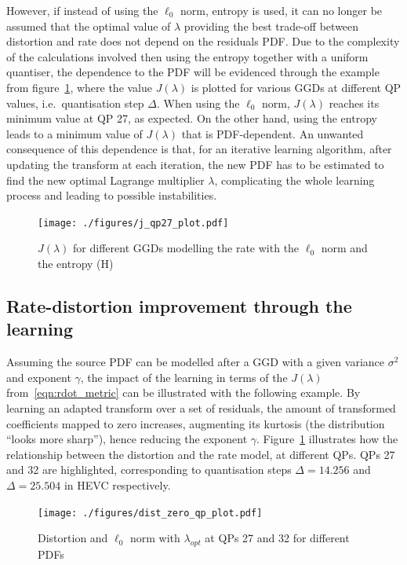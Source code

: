 \documentclass[11pt,a4paper,openright,twoside]{book}
\numberwithin{equation}{section} %
\begin{document}
However, if instead of using the $\ell_0$ norm, entropy is used, it can
no longer be assumed that the optimal value of $\lambda$ providing the
best trade-off between distortion and rate does not depend on the
residuals \ac{PDF}.
Due to the complexity of the calculations involved then using the
entropy together with a uniform quantiser, the dependence to the
\ac{PDF} will be evidenced through the example from
figure~\ref{fig:j_lambda_qp}, where the value $J(\lambda)$ is plotted
for various \acp{GGD} at different \ac{QP} values, i.e.\ quantisation
step $\Delta$.
When using the $\ell_0$ norm, $J(\lambda)$ reaches its minimum value at
QP 27, as expected.
On the other hand, using the entropy leads to a minimum value of
$J(\lambda)$ that is \ac{PDF}-dependent.
An unwanted consequence of this dependence is that, for an iterative
learning algorithm, after updating the transform at each iteration, the
new \ac{PDF} has to be estimated to find the new optimal Lagrange
multiplier $\lambda$, complicating the whole learning process and
leading to possible instabilities.
\begin{figure}[tp]
	\centering
	\texttt{[image: ./figures/j\_qp27\_plot.pdf]}
	\caption{$J(\lambda)$ for different \acp{GGD} modelling the rate with
	the $\ell_0$ norm and the entropy (H)}
	\label{fig:j_lambda_qp}
\end{figure}

\subsection{Rate-distortion improvement through the learning}
\label{sub:rate_distortion_improvement_through_the_learning}

Assuming the source \ac{PDF} can be modelled after a \ac{GGD} with a
given variance $\sigma^2$ and exponent $\gamma$, the impact of the
learning in terms of the $J(\lambda)$ from~\eqref{eqn:rdot_metric} can
be illustrated with the following example.
By learning an adapted transform over a set of residuals, the amount of
transformed coefficients mapped to zero increases, augmenting its
kurtosis (the distribution ``looks more sharp''), hence reducing the
exponent $\gamma$.
Figure~\ref{fig:j_lambda_qp} illustrates how the relationship between
the distortion and the rate model, at different \acp{QP}.
\acp{QP} 27 and 32 are highlighted, corresponding to quantisation steps
$\Delta = 14.256$ and $\Delta = 25.504$ in \ac{HEVC} respectively.

\begin{figure}[tp]
	\centering
	\texttt{[image: ./figures/dist\_zero\_qp\_plot.pdf]}
	\caption{Distortion and $\ell_0$ norm with $\lambda_{opt}$ at
	\acsp{QP} 27 and 32 for different \acsp{PDF}}
	\label{fig:lambda_zero_norm_dist}
\end{figure}
\end{document}
